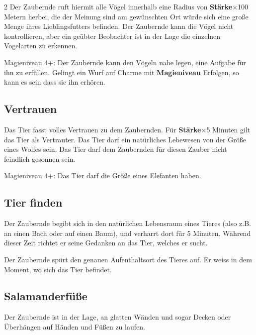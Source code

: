 \begin{multicols*}{2}
Der Zaubernde ruft hiermit alle Vögel innerhalb eine Radius von \textbf{Stärke}×100 Metern herbei, die der Meinung sind am gewünschten Ort würde sich eine große Menge ihres Lieblingsfutters befinden. Der Zaubernde kann die Vögel nicht kontrollieren, aber ein geübter Beobachter ist in der Lage die einzelnen Vogelarten zu erkennen.

Magieniveau 4+: Der Zaubernde kann den Vögeln nahe legen, eine Aufgabe für ihn zu erfüllen. Gelingt ein Wurf auf Charme mit \textbf{Magieniveau} Erfolgen, so kann es sein dass sie ihn erhören.



\subsection{Vertrauen}

Das Tier fasst volles Vertrauen zu dem Zaubernden. Für \textbf{Stärke}×5 Minuten gilt das Tier als Vertrauter. Das Tier darf ein natürliches Lebewesen von der Größe eines Wolfes sein. Das Tier darf dem Zaubernden für diesen Zauber nicht feindlich gesonnen sein.

Magieniveau 4+: Das Tier darf die Größe eines Elefanten haben.



\subsection{Tier finden}

Der Zaubernde begibt sich in den natürlichen Lebensraum eines Tieres (also z.B. an einen Bach oder auf einen Baum), und verharrt dort für 5 Minuten. Während dieser Zeit richtet er seine Gedanken an das Tier, welches er sucht.

Der Zaubernde spürt den genauen Aufenthaltsort des Tieres auf. Er weiss in dem Moment, wo sich das Tier befindet.



\subsection{Salamanderfüße}

Der Zaubernde ist in der Lage, an glatten Wänden und sogar Decken oder Überhängen auf Händen und Füßen zu laufen.


\end{multicols*}
